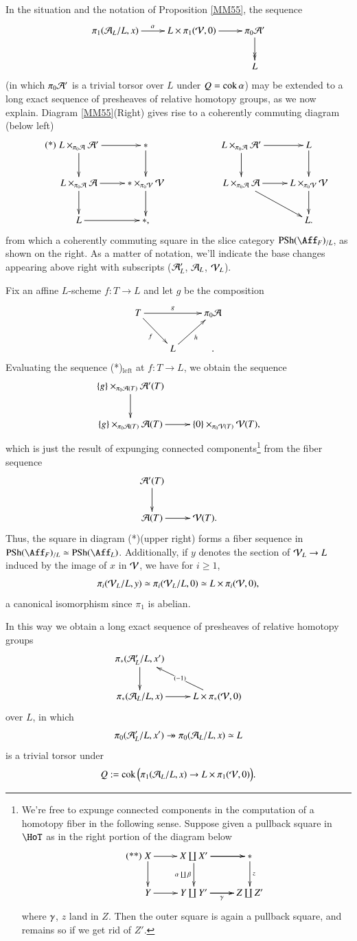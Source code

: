 \begin{ssRemark}
\label{VF44}
In the situation and the notation of Proposition \ref{MM55}, the sequence 
\[
\xymatrix{
\pi_1(\Aa_L/L,x) \ar[r]^-\al &
L \times \pi_1(\Vv,0) \ar[r] &
\pi_0 \Aa' \ar@{->>}[d]
\\
&& L
}
\]
(in which $\pi_0 \mathcal{A}'$ is a trivial torsor over $L$ under $Q = \operatorname{cok} \alpha$) may be extended to a long exact sequence of presheaves of relative homotopy groups, as we now explain. Diagram \ref{MM55}(Right) gives rise to a coherently commuting diagram (below left)
\[
\tag{*}
\xymatrix{
L \times_{\pi_0 \Aa} \Aa' \ar[r] \ar[d]
&
\ast \ar[d]
&&
L \times_{\pi_0 \Aa} \Aa' \ar[r] \ar[d] &
L \ar[d]
\\
L \times_{\pi_0\Aa} \Aa \ar[r] \ar[d] &
\ast \times_{\pi_0 \Vv}  \Vv  \ar[d]
&&
L \times_{\pi_0 \Aa} \Aa \ar[r] \ar[dr] & 
L \times_{\pi_0 \Vv} \Vv \ar[d]
\\
L \ar[r] & \ast ,
&&
& L . 
}
\]
from which a coherently commuting square in the slice category $\PSh(\Aff_F)_{/L}$, as shown on the right. As a matter of notation, we'll indicate the base changes appearing above right with subscripts ($\mathcal{A}'_L$, $\mathcal{A}_L$, $\mathcal{V}_L$). 

Fix an affine $L$-scheme $f: T \to L$ and let $g$ be the composition 
\[
\xymatrix{
T \ar[rr]^-g \ar[dr]_-f && \pi_0 \Aa
\\
& L \ar[ur]_-h &.
}
\]
Evaluating the sequence (*)$_\text{left}$ at $f:T \to L$, we obtain the sequence
\[
\xymatrix{
\{g\} \times_{\pi_0\Aa(T)} \Aa'(T)
\ar[d]
\\
\{g\} \times_{\pi_0\Aa(T)} \Aa(T)
\ar[r]
&
\{0 \} \times_{\pi_0\Vv(T)} \Vv(T),
}
\]
which is just the result of expunging connected components\footnote{We're free to expunge connected components in the computation of a homotopy fiber in the following sense. Suppose given a pullback square in $\HoT$ as in the right portion of the diagram below
\[
\tag{**}
\xymatrix{
X \ar[r] \ar[d] & X \ar[r] \coprod X' \ar[d]_-{\al \coprod \be} \ar[r] & \ast \ar[d]^-z
\\
Y \ar[r] & Y \ar[r] \coprod Y' \ar[r]_\ga & Z \coprod Z'
}
\]
where $\gamma$, $z$ land in $Z$. Then the outer square is again a pullback square, and remains so if we get rid of $Z'$. } from the fiber sequence 
\[
\xymatrix{
\Aa'(T) \ar[d]
\\
\Aa(T) \ar[r]
& \Vv(T).
}
\] 
Thus, the square in diagram (*)(upper right) forms a fiber sequence in $\PSh(\Aff_F)_{/L} \simeq \PSh(\Aff_L)$. Additionally, if $y$ denotes the section of $\mathcal{V}_L \to L$ induced by the image of $x$ in $\mathcal{V}$, we have for $i\ge 1$,
\[
\pi_i (\mathcal{V}_L/L, y) \simeq \pi_i(\mathcal{V}_L/L, 0) \simeq L \times \pi_i(\mathcal{V},0),
\]
a canonical isomorphism since $\pi_1$ is abelian. 

In this way we obtain a long exact sequence of presheaves of relative homotopy groups 
\[
\xymatrix{
\pi_*( \Aa'_L / L, x') \ar[d]
\\
\pi_* ( \Aa_L/L, x) \ar[r]
&
L \times \pi_* (\Vv,0) \ar[ul]|-{(-1)}
}
\]
over $L$, in which 
\[
\pi_0( \mathcal{A}'_L/L,x') \twoheadrightarrow
\pi_0( \mathcal{A}_L/L,x) \simeq L
\]
is a trivial torsor under 
\[
Q := \operatorname{cok}
\Big(
\pi_1(\mathcal{A}_L/L, x) \to L \times \pi_1(\mathcal{V},0)
\Big).
\]
\end{ssRemark}



